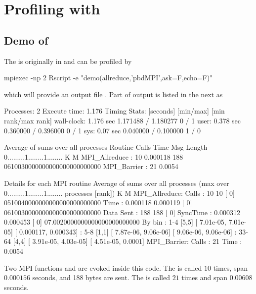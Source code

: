 \section{Profiling with }
\label{sec:ex_fpmpi}


\subsection{Demo of }

The  is originally in  and can be profiled
by
\begin{Code}
mpiexec -np 2 Rscript -e "demo(allreduce,'pbdMPI',ask=F,echo=F)"
\end{Code}
which will provide an output file .
Part of output is listed in the next as
\begin{Output}
Processes:      2
Execute time:   1.176
Timing Stats: [seconds] [min/max]       [min rank/max rank]
wall-clock: 1.176 sec 1.171488 / 1.180277     0 / 1
user: 0.378 sec 0.360000 / 0.396000     0 / 1
sys: 0.07 sec  0.040000 / 0.100000     1 / 0

Average of sums over all processes
Routine                 Calls       Time Msg Length    %
0.........1........1........
K        M
MPI_Allreduce       :      10   0.000118        188 0610030000000000000000000000
MPI_Barrier         :      21     0.0054        

Details for each MPI routine
Average of sums over all processes
(max over          0.........1........1........
 processes [rank])           K        M
MPI_Allreduce:
  Calls     :         10           10 [   0] 0510040000000000000000000000
Time      :   0.000118     0.000119 [   0] 0610030000000000000000000000
Data Sent :        188          188 [   0]
SyncTime  :   0.000312     0.000453 [   0] 07.0020000000000000000000000
By bin    : 1-4 [5,5]   [  7.01e-05,  7.01e-05] [  0.000117,  0.000343]
: 5-8 [1,1]   [  7.87e-06,  9.06e-06] [  9.06e-06,  9.06e-06]
: 33-64       [4,4]   [  3.91e-05,  4.03e-05] [  4.51e-05,    0.0001]
MPI_Barrier:
  Calls     :         21
Time      :     0.0054
\end{Output}
Two MPI  functions  and  are
evoked inside this  code. The  is called $10$
  times, span $0.000156$ seconds, and 188 bytes are sent.
The  is called $21$ times and span $0.00608$ seconds.


